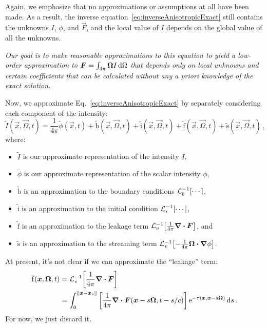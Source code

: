 Again, we emphasize that no approximations or assumptions at all have been
made. As a
result, the inverse equation~\eqref{eq:inverseAnisotropicExact} still contains
the unknowns $I$, $\phi$, and $\vec{F}$, and the local value of
$I$ depends on the global value of all the unknowns.

\emph{
Our goal is to make reasonable approximations to this equation to yield a
low-order approximation to $\bm{F}=\int_{4\pi}\bm{\Omega} I \mathop{}\!\mathrm{d} \Omega$ that
depends only on local unknowns and certain coefficients that can be calculated
without any \emph{a priori} knowledge of the exact solution.
}

Now, we approximate Eq.~\eqref{eq:inverseAnisotropicExact} by
separately considering each component of the intensity:
\begin{equation}\label{eq:approxIntensity1}
  \tilde I(\vec{x}, \vec{\Omega}, t)
  = \frac1{4\pi} \tilde \phi(\vec{x}, t) 
  + \mathrm{ \tilde b }(\vec{x}, \vec{\Omega}, t)
  + \mathrm{ \tilde i }(\vec{x}, \vec{\Omega}, t)
  + \mathrm{ \tilde f }(\vec{x}, \vec{\Omega}, t)
  + \mathrm{ \tilde s }(\vec{x}, \vec{\Omega}, t) \,,
\end{equation}
where:
\prelistpar\begin{itemize}
  \item $\tilde I$ is our approximate representation of the intensity $I$,
  \item $\tilde \phi$ is our approximate representation of the scalar intensity
    $\phi$,
  \item $\mathrm{ \tilde b }$ is an approximation to the boundary conditions
    $\mathcal{L}_{b}^{-1}\!\left[\cdots\right]$,
  \item $\mathrm{ \tilde i }$ is an approximation to the initial condition 
    $\mathcal{L}_{i}^{-1}\!\left[\cdots\right]$,
  \item $\mathrm{ \tilde f }$ is an approximation to the leakage term
    $\mathcal{L}_{v}^{-1}\!\left[ \frac1{4\pi} \bm{\nabla} \bm{\cdot} \bm{F} \right]$, and
  \item $\mathrm{ \tilde s }$ is an approximation to the streaming term
    $\mathcal{L}_{v}^{-1}\!\left[ -\frac1{4\pi} \bm{\Omega}\bm{\cdot} \bm{\nabla} \phi \right]$.
\end{itemize}

At present, it's not clear if we can approximate the ``leakage'' term:
\begin{align*}
  \mathrm{ \tilde f }(\bm{x}, \bm{\Omega}, t) &=
   \mathcal{L}_{v}^{-1}\!\left[ \frac1{4\pi}\bm{\nabla} \bm{\cdot} \bm{F} \right]
  \\
  &= \int_{0}^{\left\| \bm{x} - \bm{x}_b \right\|}
    \left[ \frac1{4\pi}\bm{\nabla} \bm{\cdot} \bm{F}(\bm{x} - s \bm{\Omega}, t-s/c)
    \right]
    \mathop{}\!\mathrm{e}^{ -\tau(\bm{x}, \bm{x} - s \bm{\Omega})}
    \mathop{}\!\mathrm{d} s \,.
\end{align*}
For now, we just discard it.

